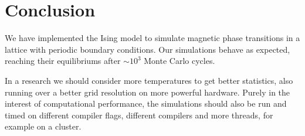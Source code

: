 \documentclass[twocolumn]{aastex62}
\begin{document}
\section{Conclusion} \label{sec:conclusion}
We have implemented the Ising model to simulate magnetic phase
transitions in a lattice with periodic boundary conditions. Our simulations behave as expected, reaching their equilibriums after
$\sim 10^3$ Monte Carlo cycles.

In a research we should consider more temperatures to get better
statistics, also running over a better grid resolution on more
powerful hardware. Purely in the interest of computational
performance, the simulations should also be run and timed
on different compiler flags, different compilers and more
threads, for example on a cluster.



\end{document}

